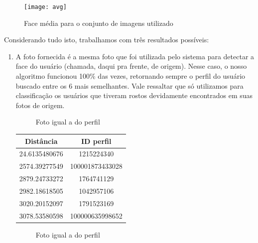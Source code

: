 \documentclass[10pt,a4paper]{article}
\begin{document}
\begin{figure}[h!]
  \begin{center}
    \texttt{[image: avg]}
    \caption{Face média para o conjunto de imagens utilizado}
  \end{center}
\end{figure}


	Considerando tudo isto, trabalhamos com três resultados possíveis:

        \begin{enumerate}
	\item A foto fornecida é a mesma foto que foi utilizada pelo sistema para detectar a face do usuário (chamada, daqui pra frente, de origem). Nesse caso, o nosso algoritmo funcionou 100\% das vezes, retornando sempre o perfil do usuário buscado entre os 6 mais semelhantes. Vale ressaltar que só utilizamos para classificação os usuários que tiveram rostos devidamente encontrados em suas fotos de origem.


\begin{flushleft}
\begin{figure}[h!]
\begin{flushleft}
  
\caption{Foto igual a do perfil}
\par\end{flushleft}
\end{figure}
\par\end{flushleft}

\begin{table}[h!]
\begin{center}
\begin{tabular}{cc}
Distância & ID perfil \\
\hline
24.6135480676 & 1215224340\\
2574.39277549 & 100001873433028\\
2879.24733272 & 1764741129\\
2982.18618505 & 1042957106\\
3020.20152097 & 1791523169\\
3078.53580598 & 100000635998652
\end{tabular}
\end{center}
\end{table}



\begin{flushleft}
\begin{figure}[h!]
\begin{flushleft}
  
\caption{Foto igual a do perfil}
\par\end{flushleft}
\end{figure}
\par\end{flushleft}


\end{enumerate}
\end{document}
